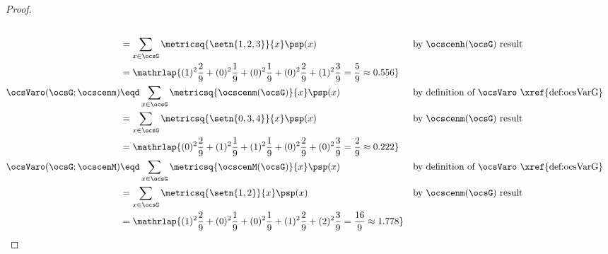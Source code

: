 \begin{tabstr}{0.75}
\begin{proof}
\begin{align*}
      \\&= \sum_{x\in\ocsG}\metricsq{\setn{1,2,3}}{x}\psp(x)
        && \text{by $\ocscenh(\ocsG)$ result}
      \\&= \mathrlap{
           (1)^2\frac{2}{9}+  %
           (0)^2\frac{1}{9}+  %
           (0)^2\frac{1}{9}+  %
           (0)^2\frac{2}{9}+  %
           (1)^2\frac{3}{9}   %
         = \frac{5}{9} \approx 0.556}
      \\
      \ocsVaro(\ocsG;\ocscenm)
        &\eqd \sum_{x\in\ocsG}\metricsq{\ocscenm(\ocsG)}{x}\psp(x)
        && \text{by definition of $\ocsVaro$ \xref{def:ocsVarG}}
      \\&= \sum_{x\in\ocsG}\metricsq{\setn{0,3,4}}{x}\psp(x)
        && \text{by $\ocscenm(\ocsG)$ result}
      \\&= \mathrlap{
           (0)^2\frac{2}{9}+  %
           (1)^2\frac{1}{9}+  %
           (1)^2\frac{1}{9}+  %
           (0)^2\frac{2}{9}+  %
           (0)^2\frac{3}{9}   %
         = \frac{2}{9} \approx 0.222}
      \\
      \ocsVaro(\ocsG;\ocscenM)
        &\eqd \sum_{x\in\ocsG}\metricsq{\ocscenM(\ocsG)}{x}\psp(x)
        && \text{by definition of $\ocsVaro$ \xref{def:ocsVarG}}
      \\&= \sum_{x\in\ocsG}\metricsq{\setn{1,2}}{x}\psp(x)
        && \text{by $\ocscenm(\ocsG)$ result}
      \\&= \mathrlap{
           (1)^2\frac{2}{9}+  %
           (0)^2\frac{1}{9}+  %
           (0)^2\frac{1}{9}+  %
           (1)^2\frac{2}{9}+  %
           (2)^2\frac{3}{9}   %
         = \frac{16}{9} \approx 1.778}
    \end{align*}
\end{proof}



\end{tabstr}
